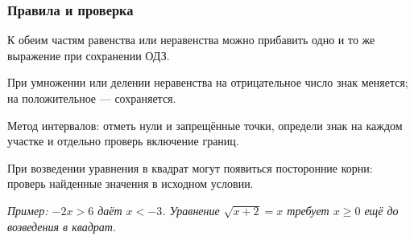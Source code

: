 \documentclass[12pt,a4paper]{article}
\theoremstyle{definition}
\theoremstyle{plain}
\theoremstyle{remark}
\begin{document}
\subsubsection*{Правила и проверка}
К обеим частям равенства или неравенства можно прибавить одно и то же выражение при сохранении ОДЗ.\par
При умножении или делении неравенства на отрицательное число знак меняется; на положительное — сохраняется.\par
Метод интервалов: отметь нули и запрещённые точки, определи знак на каждом участке и отдельно проверь включение границ.\par
При возведении уравнения в квадрат могут появиться посторонние корни: проверь найденные значения в исходном условии.\par
{\small\textit{Пример: \(- 2 x > 6\) даёт \(x < - 3\). Уравнение \(\sqrt{x + 2} = x\) требует \(x \ge  0\) ещё до возведения в квадрат.}}\par
\end{document}
